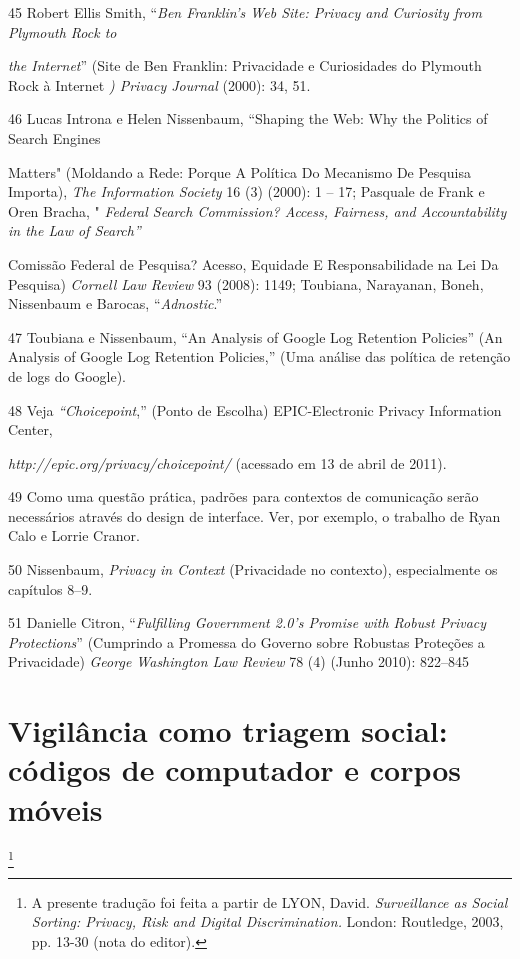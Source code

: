 45 Robert Ellis Smith, ``\emph{Ben Franklin's Web Site: Privacy and
Curiosity from Plymouth Rock to}

\emph{the Internet}'' (Site de Ben Franklin: Privacidade e Curiosidades
do Plymouth Rock à Internet \emph{) Privacy Journal} (2000): 34, 51.

46 Lucas Introna e Helen Nissenbaum, ``Shaping the Web: Why the Politics
of Search Engines

Matters" (Moldando a Rede: Porque A Política Do Mecanismo De Pesquisa
Importa), \emph{The Information Society} 16 (3) (2000): 1 -- 17;
Pasquale de Frank e Oren Bracha, " \emph{Federal Search Commission?
Access, Fairness, and Accountability in the Law of Search''}

Comissão Federal de Pesquisa? Acesso, Equidade E Responsabilidade na Lei
Da Pesquisa) \emph{Cornell Law Review} 93 (2008): 1149; Toubiana,
Narayanan, Boneh, Nissenbaum e Barocas, ``\emph{Adnostic}.''

47 Toubiana e Nissenbaum, ``An Analysis of Google Log Retention
Policies'' (An Analysis of Google Log Retention Policies,'' (Uma análise
das política de retenção de logs do Google).

48 Veja \emph{``Choicepoint},'' (Ponto de Escolha) EPIC-Electronic
Privacy Information Center,

\emph{http://epic.org/privacy/choicepoint/}
(acessado em 13 de abril de 2011).

49 Como uma questão prática, padrões para contextos de comunicação serão
necessários através do design de interface. Ver, por exemplo, o trabalho
de Ryan Calo e Lorrie Cranor.

50 Nissenbaum, \emph{Privacy in Context} (Privacidade no contexto),
especialmente os capítulos 8--9.

51 Danielle Citron, ``\emph{Fulfilling Government 2.0's Promise with
Robust Privacy Protections}'' (Cumprindo a Promessa do Governo sobre
Robustas Proteções a Privacidade) \emph{George Washington Law Review} 78
(4) (Junho 2010): 822--845

\chapter{Vigilância como triagem social: códigos de computador e corpos
móveis}\footnote{A presente tradução foi feita a partir de LYON, David.
  \emph{Surveillance as Social Sorting: Privacy, Risk and Digital
  Discrimination.} London: Routledge, 2003, pp. 13-30 (nota do editor).}

